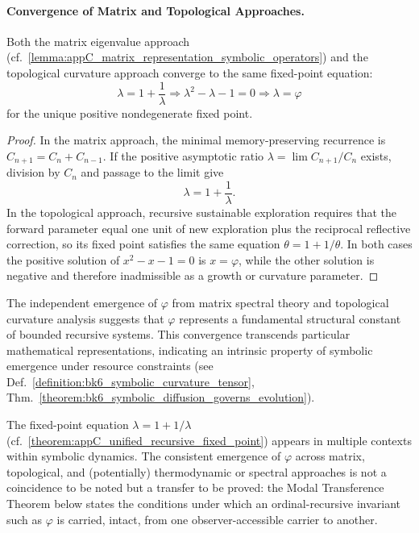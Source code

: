 \paragraph{Convergence of Matrix and Topological Approaches.}
\label{subsec:appC_convergence_matrix_topological}

\begin{theorem}
\label{theorem:appC_unified_recursive_fixed_point}
Both the matrix eigenvalue approach (cf.~\ref{lemma:appC_matrix_representation_symbolic_operators}) and the topological curvature approach converge to the same fixed-point equation:
\[
\lambda = 1 + \frac{1}{\lambda} \Rightarrow \lambda^2 - \lambda - 1 = 0 \Rightarrow \lambda = \varphi
\]
for the unique positive nondegenerate fixed point.
\end{theorem}

\begin{proof}
\label{proof:appC_unified_recursive_fixed_point}
In the matrix approach, the minimal memory-preserving recurrence is
$C_{n+1}=C_n+C_{n-1}$. If the positive asymptotic ratio
$\lambda=\lim C_{n+1}/C_n$ exists, division by $C_n$ and passage to the limit give
\[
\lambda=1+\frac{1}{\lambda}.
\]
In the topological approach, recursive sustainable exploration requires that the
forward parameter equal one unit of new exploration plus the reciprocal
reflective correction, so its fixed point satisfies the same equation
$\theta=1+1/\theta$. In both cases the positive solution of
$x^2-x-1=0$ is $x=\varphi$, while the other solution is negative and therefore
inadmissible as a growth or curvature parameter.
\end{proof}

\begin{scholium}
\label{scholium:appC_structural_universality_phi}
The independent emergence of $\varphi$ from matrix spectral theory and topological curvature analysis suggests that $\varphi$ represents a fundamental structural constant of bounded recursive systems. This convergence transcends particular mathematical representations, indicating an intrinsic property of symbolic emergence under resource constraints (see Def.~\ref{definition:bk6_symbolic_curvature_tensor}, Thm.~\ref{theorem:bk6_symbolic_diffusion_governs_evolution}).
\end{scholium}

\begin{remark}
\label{remark:appC_connection_other_modalities}
The fixed-point equation $\lambda = 1 + 1/\lambda$ (cf.~\ref{theorem:appC_unified_recursive_fixed_point}) appears in multiple contexts within symbolic dynamics. The consistent emergence of $\varphi$ across matrix, topological, and (potentially) thermodynamic or spectral approaches is not a coincidence to be noted but a transfer to be proved: the Modal Transference Theorem below states the conditions under which an ordinal-recursive invariant such as $\varphi$ is carried, intact, from one observer-accessible carrier to another.
\end{remark}

